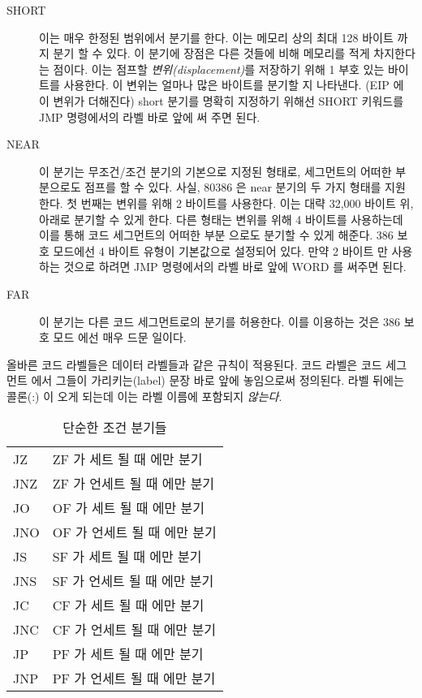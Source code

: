 \begin{description}

\item[SHORT] 
이는 매우 한정된 범위에서 분기를 한다. 이는 메모리 상의 최대 128 바이트 까지 분기
할 수 있다. 이 분기에 장점은 다른 것들에 비해 메모리를 적게 차지한다는 점이다. 이는 
점프할 \emph{변위(displacement)}를 저장하기 위해 1 부호 있는 바이트를 사용한다. 
이 변위는 얼마나 많은 바이트를 분기할 지 나타낸다. (EIP 에 이 변위가 더해진다) 
short 분기를 명확히 지정하기 위해선 {\code SHORT} 키워드를 {\code JMP} 명령에서의
라벨 바로 앞에 써 주면 된다. 

\item[NEAR] 
이 분기는 무조건/조건 분기의 기본으로 지정된 형태로, 세그먼트의 어떠한 부분으로도
점프를 할 수 있다. 사실, 80386 은 near 분기의 두 가지 형태를 지원한다. 첫 번째는 
변위를 위해 2 바이트를 사용한다. 이는 대략 32,000 바이트 위, 아래로 분기할 수 있게 한다.
다른 형태는 변위를 위해 4 바이트를 사용하는데 이를 통해 코드 세그먼트의 어떠한 부분
으로도 분기할 수 있게 해준다. 386 보호 모드에선 4 바이트 유형이 기본값으로 설정되어 있다.
만약 2 바이트 만 사용하는 것으로 하려면 {\code JMP} 명령에서의 라벨 바로 앞에 
{\code WORD} 를 써주면 된다. 


\item[FAR]
이 분기는 다른 코드 세그먼트로의 분기를 허용한다. 이를 이용하는 것은 386 보호 모드
에선 매우 드문 일이다. 
\end{description}

올바른 코드 라벨들은 데이터 라벨들과 같은 규칙이 적용된다. 코드 라벨은 코드 세그먼트 에서
그들이 가리키는(label) 문장 바로 앞에 놓임으로써 정의된다. 라벨 뒤에는 콜론(:) 이 오게
되는데 이는 라벨 이름에 포함되지 \emph{않는다}. 


\begin{table}[t]
\center
\begin{tabular}{|ll|}
\hline
JZ  & ZF 가 세트 될 때 에만 분기  \\
JNZ & ZF 가 언세트 될 때 에만 분기 \\
JO  & OF 가 세트 될 때 에만 분기 \\
JNO & OF 가 언세트 될 때 에만 분기 \\
JS  & SF 가 세트 될 때 에만 분기 \\
JNS & SF 가 언세트 될 때 에만 분기 \\
JC  & CF 가 세트 될 때 에만 분기 \\
JNC & CF 가 언세트 될 때 에만 분기 \\
JP  & PF 가 세트 될 때 에만 분기 \\
JNP & PF 가 언세트 될 때 에만 분기 \\
\hline
\end{tabular}
\caption{단순한 조건 분기들 \label{tab:SimpBran}  
             
         }
\end{table}

